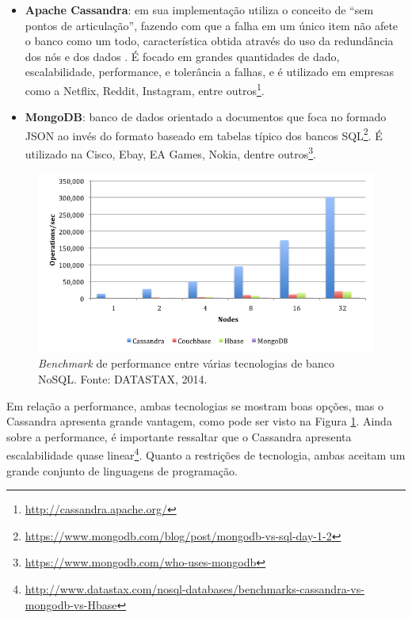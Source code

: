 \begin{itemize}
    \item \textbf{Apache Cassandra}: em sua implementação utiliza o conceito
        de ``sem pontos de articulação'', fazendo com que a falha em um único
        item não afete o banco como um todo, característica obtida através do
        uso da redundância dos nós e dos dados \cite{estrada2016}. É focado em
        grandes quantidades de dado, escalabilidade, performance, e tolerância
        a falhas, e é utilizado em empresas como a Netflix, Reddit, Instagram,
        entre outros\footnote{\url{http://cassandra.apache.org/}}.

    \item \textbf{MongoDB}: banco de dados orientado a documentos que foca no
        formado JSON ao invés do formato baseado em tabelas típico dos bancos
        SQL\footnote{\url{https://www.mongodb.com/blog/post/mongodb-vs-sql-day-1-2}}.
        É utilizado na Cisco, Ebay, EA Games, Nokia, dentre
        outros\footnote{\url{https://www.mongodb.com/who-uses-mongodb}}.
\end{itemize}

\begin{figure}
  \centering
    \includegraphics[scale=0.6]{figuras/Operations-Per-Second-Per-Node-Cluster-v2.png}
    \caption{\textit{Benchmark} de performance entre várias tecnologias de banco NoSQL. Fonte: DATASTAX, 2014.}
  \label{fig:cassandrabenchmark}
\end{figure}

Em relação a performance, ambas tecnologias se mostram boas opções, mas o
Cassandra apresenta grande vantagem, como pode ser visto na Figura
\ref{fig:cassandrabenchmark}. Ainda sobre a performance, é importante
ressaltar que o Cassandra apresenta escalabilidade quase
linear\footnote{\url{http://www.datastax.com/nosql-databases/benchmarks-cassandra-vs-mongodb-vs-Hbase}}.
Quanto a restrições de tecnologia, ambas aceitam um grande conjunto de
linguagens de programação.

